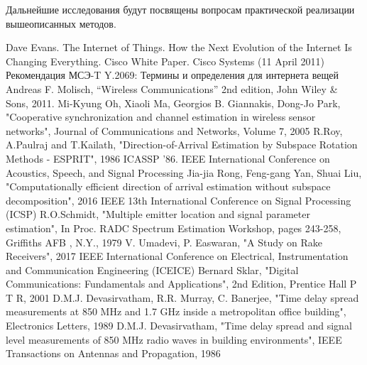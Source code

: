 \documentclass[a4paper,12pt,oneside, abstract=true]{scrartcl}
\begin{document}
Дальнейшие исследования будут посвящены вопросам практической реализации вышеописанных методов. 

\cleardoublepage
\begin{thebibliography}{99}
 Dave Evans. The Internet of Things. How the Next Evolution of the Internet Is Changing Everything. Cisco White Paper. Cisco Systems (11 April 2011)
 Рекомендация МСЭ-T Y.2069: Термины и определения для интернета вещей 
 Andreas F. Molisch, “Wireless Communications” 2nd edition, John Wiley \& Sons, 2011.
 Mi-Kyung Oh, Xiaoli Ma, Georgios B. Giannakis, Dong-Jo Park, "Cooperative synchronization and channel estimation in wireless sensor networks", Journal of Communications and Networks, Volume 7, 2005
 R.Roy, A.Paulraj and T.Kailath, "Direction-of-Arrival Estimation by Subspace Rotation Methods - ESPRIT", 1986 ICASSP '86. IEEE International Conference on Acoustics, Speech, and Signal Processing
 Jia-jia Rong, Feng-gang Yan, Shuai Liu, "Computationally efficient direction of arrival estimation without subspace decomposition", 2016 IEEE 13th International Conference on Signal Processing (ICSP)
 R.O.Schmidt, "Multiple emitter location and signal parameter estimation", In Proc. RADC Spectrum Estimation Workshop, pages 243-258, Griffiths AFB , N.Y., 1979
 V. Umadevi, P. Easwaran, "A Study on Rake Receivers",  2017 IEEE International Conference on Electrical, Instrumentation and Communication Engineering (ICEICE)
 Bernard Sklar, "Digital Communications: Fundamentals and Applications", 2nd Edition, Prentice Hall P T R, 2001
 D.M.J. Devasirvatham, R.R. Murray, C. Banerjee, "Time delay spread measurements at 850 MHz and 1.7 GHz inside a metropolitan office building", Electronics Letters, 1989
 D.M.J. Devasirvatham, "Time delay spread and signal level measurements of 850 MHz radio waves in building environments", IEEE Transactions on Antennas and Propagation, 1986
\end{thebibliography}

\cleardoublepage
\end{document}
